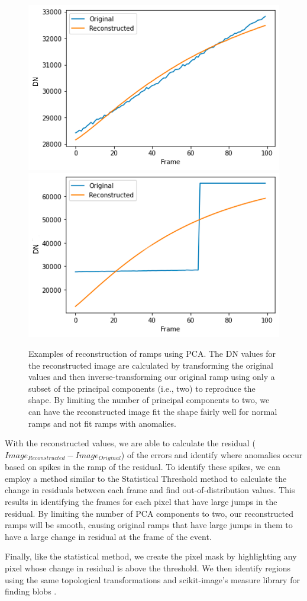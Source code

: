 \begin{figure}
    \centering
    \includegraphics[width=0.49\linewidth]{figs/rst/PCA_Good.png}
    \includegraphics[width=0.49\linewidth]{figs/rst/PCA_Bad.png}
    \caption[Examples of using PCA to Ramp Jumps Through Reconstruction for WFI Detector Data]{Examples of reconstruction of ramps using PCA. The DN values for the reconstructed image are calculated by transforming the original values and then inverse-transforming our original ramp using only a subset of the principal components (i.e., two) to reproduce the shape. By limiting the number of principal components to two, we can have the reconstructed image fit the shape fairly well for normal ramps and not fit ramps with anomalies.}
    \label{rst/fig:PCA}
\end{figure}

With the reconstructed values, we are able to calculate the residual ($Image_{Reconstructed} - Image_{Original}$) of the errors and identify where anomalies occur based on spikes in the ramp of the residual. 
To identify these spikes, we can employ a method similar to the Statistical Threshold method to calculate the change in residuals between each frame and find out-of-distribution values. 
This results in identifying the frames for each pixel that have large jumps in the residual. 
By limiting the number of PCA components to two, our reconstructed ramps will be smooth, causing original ramps that have large jumps in them to have a large change in residual at the frame of the event.

Finally, like the statistical method, we create the pixel mask by highlighting any pixel whose change in residual is above the threshold.
We then identify regions using the same topological transformations and scikit-image's measure library for finding blobs \parencite{scikit-image}.

